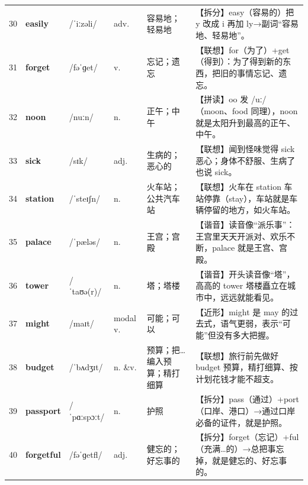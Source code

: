 \documentclass[UTF8,a4paper,11pt,oneside]{ctexbook}
\newcommand{\cellword}[1]{{\bfseries\textcolor{wordcol}{#1}}}
\newcommand{\cellipa}[1]{{\footnotesize\textcolor{ipacol}{#1}}}
\newcommand{\cellpos}[1]{\textcolor{poscol}{#1}}
\newcommand{\cellno}[1]{\textcolor{volcolor!75!black}{#1}}
\begin{document}
{\begin{longtable}{@{}C{0.045\textwidth}L{0.155\textwidth}L{0.175\textwidth}C{0.070\textwidth}L{0.180\textwidth}L{0.282\textwidth}@{}}
\cellno{30} & \cellword{easily} & \cellipa{/ˈiːzəli/} & \cellpos{adv.} & 容易地；轻易地 & \textcolor{tagSplit}{【拆分】}easy（容易的）把 y 改成 i 再加 ly→\allowbreak{}副词“容易地、轻易地”。 \\
 \cellno{31} & \cellword{forget} & \cellipa{/fəˈɡet/} & \cellpos{v.} & 忘记；遗忘 & \textcolor{tagAssoc}{【联想】}for（为了）+get（得到）：为了得到新的东西，把旧的事情忘记、遗忘。 \\
\cellno{32} & \cellword{noon} & \cellipa{/nuːn/} & \cellpos{n.} & 正午；中午 & \textcolor{tagSpell}{【拼读】}oo 发 /uː/（moon、food 同理），noon 就是太阳升到最高的正午、中午。 \\
 \cellno{33} & \cellword{sick} & \cellipa{/sɪk/} & \cellpos{adj.} & 生病的；恶心的 & \textcolor{tagAssoc}{【联想】}闻到怪味觉得 sick 恶心；身体不舒服、生病了也说 sick。 \\
\cellno{34} & \cellword{station} & \cellipa{/ˈsteɪʃn/} & \cellpos{n.} & 火车站；公共汽车站 & \textcolor{tagAssoc}{【联想】}火车在 station 车站停靠（stay），车站就是车辆停留的地方，如火车站。 \\
 \cellno{35} & \cellword{palace} & \cellipa{/ˈpæləs/} & \cellpos{n.} & 王宫；宫殿 & \textcolor{tagSound}{【谐音】}读音像“派乐事”：王宫里天天开派对、欢乐不断，palace 就是王宫、宫殿。 \\
\cellno{36} & \cellword{tower} & \cellipa{/ˈtaʊə(r)/} & \cellpos{n.} & 塔；塔楼 & \textcolor{tagSound}{【谐音】}开头读音像“塔”，高高的 tower 塔楼矗立在城市中，远远就能看见。 \\
 \cellno{37} & \cellword{might} & \cellipa{/maɪt/} & \cellpos{modal v.} & 可能；可以 & \textcolor{tagNear}{【近形】}might 是 may 的过去式，语气更弱，表示“可能”但没有多大把握。 \\
\cellno{38} & \cellword{budget} & \cellipa{/ˈbʌdʒɪt/} & \cellpos{n. \&v.} & 预算；把…编入预算；精打细算 & \textcolor{tagAssoc}{【联想】}旅行前先做好 budget 预算，精打细算、按计划花钱才能不超支。 \\
 \cellno{39} & \cellword{passport} & \cellipa{/ˈpɑːspɔːt/} & \cellpos{n.} & 护照 & \textcolor{tagSplit}{【拆分】}pass（通过）+port（口岸、港口）→\allowbreak{}通过口岸必备的证件，就是护照。 \\
\cellno{40} & \cellword{forgetful} & \cellipa{/fəˈɡetfl/} & \cellpos{adj.} & 健忘的；好忘事的 & \textcolor{tagSplit}{【拆分】}forget（忘记）+ful（充满…的）→\allowbreak{}总把事忘掉，就是健忘的、好忘事的。 \\

\end{longtable}}
\end{document}
